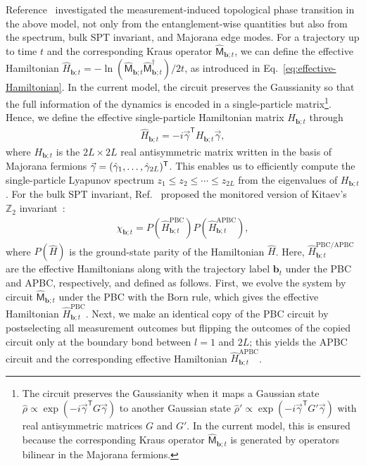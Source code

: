 \documentclass[preprint,pteplogo]{ptephy_v2}%
\numberwithin{equation}{section}
\theoremstyle{definition}
\newcommand{\mbb}[1]{\mathbb{#1}}
\begin{document}
Reference~\cite{oshima2025topology} investigated the measurement-induced topological phase transition in the above model, not only from the entanglement-wise quantities but also from the spectrum, bulk SPT invariant, and Majorana edge modes.
For a trajectory up to time $t$ and the corresponding Kraus operator $\hat{\mathsf{M}}_{\bm{b};t}$, we can define the effective Hamiltonian $\hat{H}_{\bm{b};t}=-\ln(\hat{\mathsf{M}}_{\bm{b};t}\hat{\mathsf{M}}_{\bm{b};t}^\dagger)/2t$, as introduced in Eq.~\eqref{eq:effective-Hamiltonian}.
In the current model, the circuit preserves the Gaussianity so that the full information of the dynamics is encoded in a single-particle matrix\footnote{
The circuit preserves the Gaussianity when it maps a Gaussian state $\hat{\rho} \propto \exp (-i \vec{\gamma}^\mathsf{T} G \vec{\gamma})$ to another Gaussian state $\hat{\rho}' \propto \exp(-i\vec{\gamma}^\mathsf{T} G' \vec{\gamma})$ with real antisymmetric matrices $G$ and $G'$.
In the current model, this is ensured because the corresponding Kraus operator $\hat{\mathsf{M}}_{\bm{b};t}$ is generated by operators bilinear in the Majorana fermions.
}.
Hence, we define the effective single-particle Hamiltonian matrix $H_{\bm{b};t}$ through
\begin{align}
    \hat{H}_{\bm{b};t} = -i\vec{\gamma}^\mathsf{T}H_{\bm{b};t}\vec{\gamma},
\end{align}
where $H_{\bm{b};t}$ is the $2L\times2L$ real antisymmetric matrix written in the basis of Majorana fermions $\vec{\gamma}=(\hat{\gamma}_1, \ldots,\hat{\gamma}_{2L})^{\sf{T}}$.
This enables us to efficiently compute the single-particle Lyapunov spectrum $z_1\leq z_2\leq\cdots\leq z_{2L}$ from the eigenvalues of $H_{\bm{b};t}$.
For the bulk SPT invariant, Ref.~\cite{oshima2025topology} proposed the monitored version of Kitaev's $\mbb{Z}_2$ invariant~\cite{Kitaev01unpaired}:
\begin{align}
    \chi_{\bm{b};t} = P(\hat{H}_{\bm{b};t}^{\mathrm{PBC}})P(\hat{H}_{\bm{b};t}^{\mathrm{APBC}}),
\end{align}
where $P(\hat{H})$ is the ground-state parity of the Hamiltonian $\hat{H}$.
Here, $\hat{H}_{\bm{b};t}^{\mathrm{PBC}/\mathrm{APBC}}$ are the effective Hamiltonians along with the trajectory label $\bm{b}_t$ under the PBC and APBC, respectively, and defined as follows.
First, we evolve the system by circuit $\hat{\mathsf{M}}_{\bm{b};t}$ under the PBC with the Born rule, which gives the effective Hamiltonian $\hat{H}^\mathrm{PBC}_{\bm{b};t}$.
Next, we make an identical copy of the PBC circuit by postselecting all measurement outcomes but flipping the outcomes of the copied circuit only at the boundary bond between $l=1$ and $2L$; this yields the APBC circuit and the corresponding effective Hamiltonian $\hat{H}^\mathrm{APBC}_{\bm{b};t}$.
\end{document}

